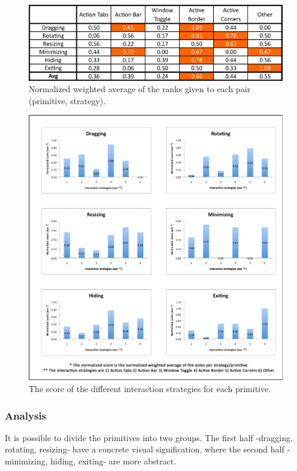 \begin{figure}[htb]
  \centering
    \includegraphics[scale=1]{images/resultMatrix}
  \caption{Normalized weighted average of the ranks given to each pair (primitive, strategy).}
  \label{resultMatrix}
\end{figure}

\begin{figure}[h!]
  \centering
    \includegraphics[width=1\textwidth]{images/primHistog}
    \caption{The score of the different interaction strategies for each primitive.}
	\label{primitives}    
\end{figure}

\subsubsection{Analysis}

It is possible to divide the primitives into two groups.
The first half -dragging, rotating, resizing- have a concrete visual signification, where the second half - minimizing, hiding, exiting- are more abstract.

